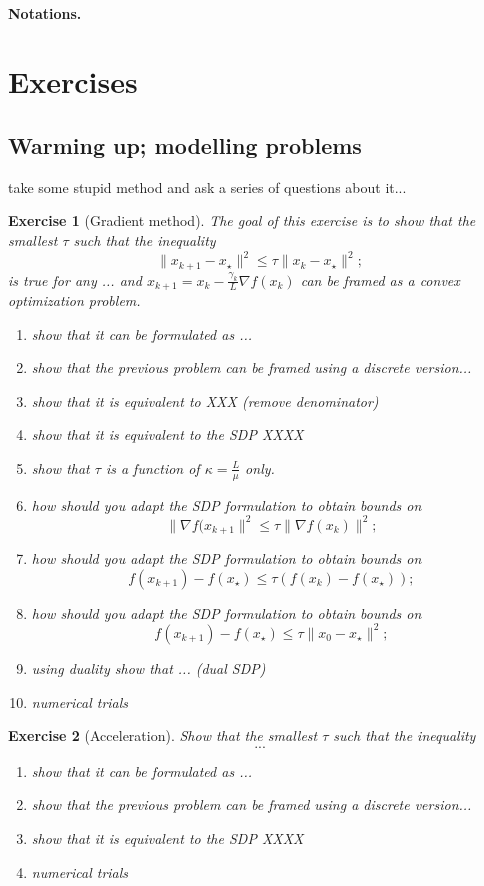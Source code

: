 \documentclass[11pt,a4paper]{article}
\newtheorem{exercise}{Exercise}
\begin{document}
	\paragraph{Notations.}
	\section{Exercises}			%
	\subsection{Warming up; modelling problems}
	
	take some stupid method and ask a series of questions about it...
	
	
	\begin{exercise}[Gradient method]
	The goal of this exercise is to show that the smallest $\tau$ such that the inequality
	\[ \|x_{k+1}-x_\star\|^2 \leqslant \tau \|x_k-x_\star\|^2; \]
	is true for any ... and $x_{k+1}=x_k-\frac{\gamma_k}{L} \nabla f(x_k)$ can be framed as a convex optimization problem.
	\begin{enumerate}
	\item show that it can be formulated as ...
	\item show that the previous problem can be framed using a discrete version...
	\item show that it is equivalent to XXX (remove denominator)
	\item show that it is equivalent to the SDP XXXX
	\item show that $\tau$ is a function of $\kappa=\frac{L}{\mu}$ only.
	\item how should you adapt the SDP formulation to obtain bounds on 
	\[ \|\nabla f(x_{k+1}\|^2 \leqslant \tau \|\nabla f(x_k)\|^2; \]
	\item how should you adapt the SDP formulation to obtain bounds on 
	\[ f(x_{k+1})-f(x_\star) \leqslant \tau (f(x_k)-f(x_\star)); \]
	\item how should you adapt the SDP formulation to obtain bounds on 
	\[ f(x_{k+1})-f(x_\star) \leqslant \tau \|x_0-x_\star\|^2; \]
	\item using duality show that ... (dual SDP)
	\item numerical trials
	\end{enumerate}
	\end{exercise}
	
	\begin{exercise}[Acceleration]
	Show that the smallest $\tau$ such that the inequality
	\[ ... \]
	\begin{enumerate}
	\item show that it can be formulated as ...
	\item show that the previous problem can be framed using a discrete version...
	\item show that it is equivalent to the SDP XXXX
	\item numerical trials
	\end{enumerate}
	\end{exercise}
	
\end{document}
